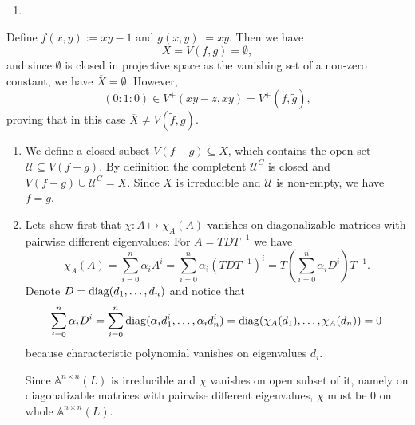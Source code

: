 \begin{exercise}{1}
\begin{enumerate}
        \item{} 
    \end{enumerate}Define $f(x,y):=xy-1$ and $g(x,y):=xy$. Then we have 
    $$X=V(f,g)=\emptyset,$$
    and since $\emptyset$ is closed in projective space as the vanishing 
    set of a non-zero constant, we have $\overline{X}=\emptyset$.
    However, 
    $$
    (0:1:0)\in V^+(xy-z,xy)=V^+(\tilde{f}, \tilde{g}),
    $$
    proving that in this case $\overline{X}\neq V(\tilde{f},\tilde{g})$.
\end{exercise}

\begin{exercise}{3}
    \begin{enumerate}
        \item{} We define a closed subset $V(f - g) \subseteq X$, which contains
            the open set $\mathcal{U} \subseteq V(f - g)$. By definition the
            completent $\mathcal{U}^C$ is closed and $V(f - g) \cup
            \mathcal{U}^C = X$. Since $X$ is irreducible and $\mathcal{U}$ is
            non-empty, we have $f = g$.

        \item{} Lets show first that $\chi \colon A \mapsto \chi_A(A)$ vanishes
            on diagonalizable matrices with pairwise different eigenvalues: For
            $A = T D T^{-1}$ we have
            \begin{equation*}
                \chi_A(A) = \sum^n_{i = 0} \alpha_i A^i = \sum^n_{i = 0}
                \alpha_i (T D T^{-1})^i = T \left( \sum^n_{i = 0} \alpha_i  D^i
                \right) T^{-1}.
            \end{equation*}
            Denote $D = \operatorname{diag}(d_1, \dots, d_n)$ and notice that
            \begin{equation*}
                \sum^n_{i = 0} \alpha_i  D^i = 
                \sum^n_{i = 0} \operatorname{diag}(\alpha_i d^i_1, \dots, \alpha_i d^i_n) = 
                \operatorname{diag}(\chi_A(d_1), \dots, \chi_A(d_n)) = 0
            \end{equation*}
            because characteristic polynomial vanishes on eigenvalues $d_i$.

            Since $\mathbb{A}^{n \times n}(L)$ is irreducible
            and $\chi$ vanishes on open subset of it, namely on diagonalizable
            matrices with pairwise different eigenvalues, $\chi$ must be $0$ on
            whole $\mathbb{A}^{n \times n}(L)$.
    \end{enumerate}
\end{exercise}

